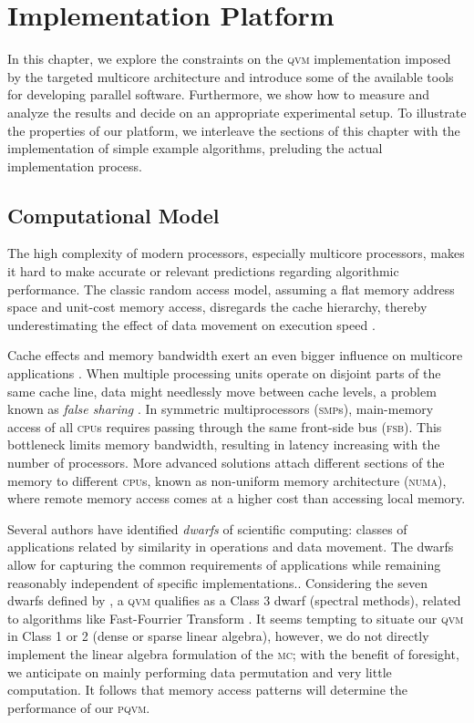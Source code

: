 \documentclass[a4paper,11pt, oneside]{report}
\newcommand{\concept}[1]{\emph{#1}}
\newcommand{\acro}[1]{\textsc{#1}}
\begin{document}

\chapter{Implementation Platform} \label{chp:platform}
In this chapter, we explore the constraints on the \acro{qvm} implementation imposed by the targeted multicore architecture and introduce some of the available tools for developing parallel software. Furthermore, we show how to measure and analyze the results and decide on an appropriate experimental setup. To illustrate the properties of our platform, we interleave the sections of this chapter with the implementation of simple example algorithms, preluding the actual implementation process.



\section{Computational Model}
The high complexity of modern processors, especially multicore processors, makes it hard to make accurate or relevant predictions regarding algorithmic performance. The classic random access model, assuming a flat memory address space and unit-cost memory access, disregards the cache hierarchy, thereby underestimating the effect of data movement on execution speed \cite{snyder-lin, chatterjee-sen}.


Cache effects and memory bandwidth exert an even bigger influence on multicore applications \cite{snyder-lin}. When multiple processing units operate on disjoint parts of the same cache line, data might needlessly move between cache levels, a problem known as \concept{false sharing} \cite{snyder-lin, sutter-jungle}. In symmetric multiprocessors (\acro{smp}s), main-memory access of all \acro{cpu}s requires passing through the same front-side bus (\acro{fsb}). This bottleneck limits memory bandwidth, resulting in latency increasing with the number of processors\cite{drepper}. More advanced solutions attach different sections of the memory to different \acro{cpu}s, known as non-uniform memory architecture (\acro{numa}), where remote memory access comes at a higher cost than accessing local memory.


Several authors have identified \concept{dwarfs} of scientific computing: classes of applications related by similarity in operations and data movement. The dwarfs allow for capturing the common requirements of applications while remaining reasonably independent of specific implementations.\cite{berkeley}. Considering the seven dwarfs defined by \cite{berkeley}, a \acro{qvm} qualifies as a Class 3 dwarf (spectral methods), related to algorithms like Fast-Fourrier Transform \cite{frigo}. It seems tempting to situate our \acro{qvm} in Class 1 or 2 (dense or sparse linear algebra), however, we do not directly implement the linear algebra formulation of the \acro{mc}; with the benefit of foresight, we anticipate on mainly performing data permutation and very little computation. It follows that memory access patterns will determine the performance of our \acro{pqvm}.
\end{document}
